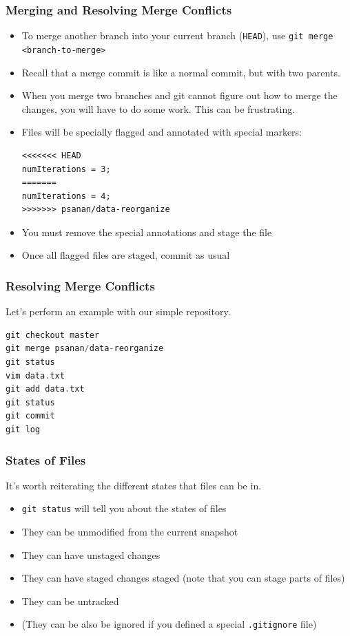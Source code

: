\documentclass{beamer}
\begin{document}
\begin{frame}[fragile]
\frametitle{Merging and Resolving Merge Conflicts}
\begin{itemize}
\item To merge another branch into your current branch (\texttt{HEAD}), use \lstinline{git merge <branch-to-merge>}
\item Recall that a merge commit is like a normal commit, but with two parents.
\item When you merge two branches and git cannot figure out how to merge the changes, you will have to do some work. This can be frustrating.
\item Files will be specially flagged and annotated with special markers:
\begin{verbatim}
<<<<<<< HEAD
numIterations = 3;
=======
numIterations = 4;
>>>>>>> psanan/data-reorganize
\end{verbatim}
\item You must remove the special annotations and stage the file
\item Once all flagged files are staged, commit as usual
\end{itemize}
\end{frame}

\begin{frame}[fragile]
\frametitle{Resolving Merge Conflicts}
Let's perform an example with our simple repository.
\begin{lstlisting}[language=C++]
git checkout master
git merge psanan/data-reorganize
git status
vim data.txt
git add data.txt
git status
git commit
git log
\end{lstlisting}
\end{frame}

\begin{frame}[fragile]
\frametitle{States of Files}
It's worth reiterating the different states that files can be in.
\begin{itemize}
\item \lstinline{git status} will tell you about the states of files
\item They can be unmodified from the current snapshot
\item They can have unstaged changes
\item They can have staged changes staged (note that you can stage parts of files)
\item They can be untracked
\item (They can be also be ignored if you defined a special \texttt{.gitignore} file)
\end{itemize}
\end{frame}
\end{document}
